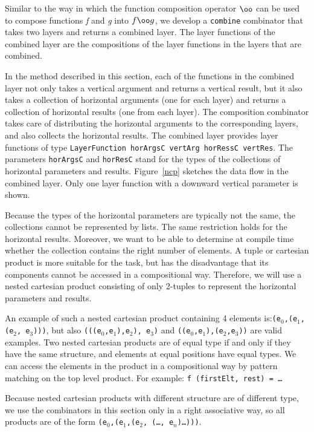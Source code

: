Similar to the way in which the function composition operator $\oo$ can be used to compose functions {\em f} and {\em g} into $f \oo g$, we develop a \texttt{combine} combinator that takes two layers and returns a combined layer. The layer functions of the combined layer are the compositions of the layer functions in the layers that are combined.

In the method described in this section, each of the functions in the combined layer not only takes a vertical argument and returns a vertical result, but it also takes a collection of horizontal arguments (one for each layer) and returns a collection of horizontal results (one from each layer). The composition combinator takes care of distributing the horizontal arguments to the corresponding layers, and also collects the horizontal results. The combined layer provides layer functions of type \texttt{LayerFunction horArgsC vertArg horRessC vertRes}. The parameters \texttt{horArgsC} and \texttt{horResC} stand for the types of the collections of horizontal parameters and results. Figure~\ref{ncp} sketches the data flow in the combined layer. Only one layer function with a downward vertical parameter is shown.

Because the types of the horizontal parameters are typically not the same, the collections cannot be represented by lists. The same restriction holds for the horizontal results. Moreover, we want to be able to determine at compile time whether the collection contains the right number of elements. A tuple or cartesian product is more suitable for the task, but has the disadvantage that its components cannot be accessed in a compositional way. Therefore, we will use a nested cartesian product consisting of only 2-tuples to represent the horizontal parameters and results.

An example of such a nested cartesian product containing 4 elements is:\texttt{(e$_0$,(e$_1$,(e$_2$, e$_3$)))}, but also \texttt{(((e$_0$,e$_1$),e$_2$), e$_3$)} and \texttt{((e$_0$,e$_1$),(e$_2$,e$_3$))} are valid examples. Two nested cartesian products are of equal type if and only if they have the same structure, and elements at equal positions have equal types. We can access the elements in the product in a compositional way by pattern matching on the top level product. For example: \texttt{f (firstElt, rest) = \dots}

Because nested cartesian products with different structure are of different type, we use the combinators in this section only in a right associative way, so all products are of the form \texttt{(e$_0$,(e$_1$,(e$_2$, (\dots, e$_n$)\dots)))}. 

